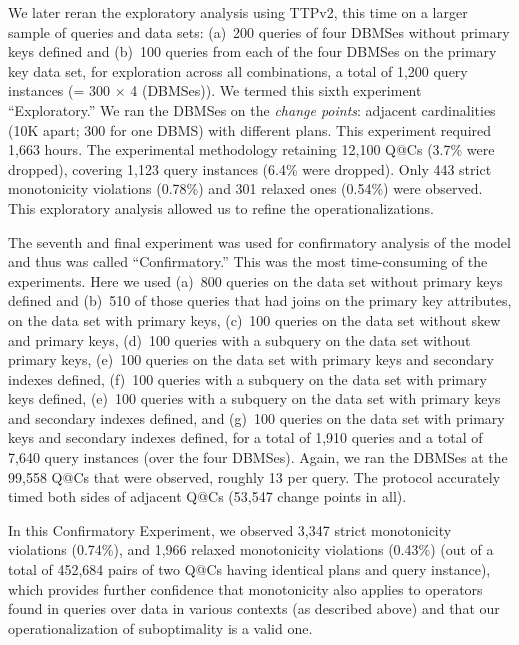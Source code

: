 \documentclass[prodmode,acmtods]{acmsmall}
\makeatletter
\def\QatC{Q{@}C}
\makeatother
\begin{document}
We later reran the exploratory analysis using TTPv2, this time on a larger sample of queries and data sets:
(a)~200 queries of four \hbox{DBMSes} without primary keys defined and
(b)~100 queries from each of the four \hbox{DBMSes} on the primary key data set,
for exploration across all combinations, a total of 1,200 query instances (= 300 $\times$ 4 (DBMSes)).
We termed this sixth experiment ``Exploratory.''  We ran the DBMSes on the {\em
  change points}: adjacent cardinalities (10K apart; 300 for one DBMS) with different
plans. This experiment required 1,663 hours. The experimental
methodology retaining 12,100 {\QatC}s (3.7\% were dropped), covering 1,123 query
instances (6.4\% were dropped). Only 443 strict monotonicity violations (0.78\%) and 301 relaxed
ones (0.54\%) were observed. This exploratory analysis allowed us to refine
the operationalizations.

The seventh and final experiment was used for confirmatory analysis of the model and thus was
called ``Confirmatory.'' This was the most time-consuming of
the experiments. Here we
used (a)~800 queries on the data set without primary keys defined and (b)~510 of
those queries that had joins on the primary key attributes, on the data set
with primary keys, 
(c)~100 queries on the data set without skew and primary keys,  
(d)~100 queries with a subquery on the data set without primary keys,  
(e)~100 queries on the data set with primary keys and secondary indexes defined, 
(f)~100 queries with a subquery on the data set with primary keys defined,  
(e)~100 queries with a subquery on the data set with primary keys and secondary indexes defined, and 
(g)~100 queries on the data set with primary keys and secondary indexes defined, 
for a total of 1,910 queries and a total of 7,640 query instances (over the
four \hbox{DBMSes}).
Again, we ran the \hbox{DBMSes} at the 99,558 {\QatC}s that were observed,
roughly 13 per query. The protocol accurately timed
both sides of adjacent {\QatC}s (53,547 change points in all).

In this Confirmatory Experiment, we observed 3,347 strict monotonicity
violations (0.74\%), and 1,966 relaxed monotonicity violations (0.43\%) (out
of a total of 452,684 pairs
of two Q@Cs having identical plans and query instance), which provides
further confidence that monotonicity also applies to operators found in
queries over data in various contexts (as described above) and that our
operationalization of suboptimality is a valid one.
\end{document}
